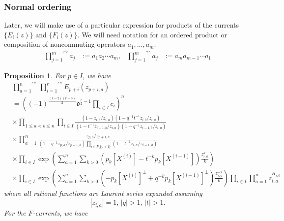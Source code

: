 \documentclass{amsart}
\newcommand{\ddd}{\mathfrak{d}}
\newtheorem{prop}[thm]{Proposition}
\theoremstyle{remark}
\numberwithin{thm}{section}
\numberwithin{equation}{section}
\begin{document}
\subsubsection{Normal ordering}
Later, we will make use of a particular expression for products of the currents $\{E_i(z)\}$ and $\{F_i(z)\}$.
We will need notation for an ordered product or composition of noncommuting operators $a_1,\ldots, a_m$:
\begin{equation}
    \begin{aligned}
    \overset{\curvearrowright}{\prod_{j=1}^m}a_j&:=a_1 a_2\cdots a_m,&
    \overset{\curvearrowleft}{\prod_{j=1}^m}a_j&:=a_m a_{m-1}\cdots a_1
    \end{aligned}
\label{OrdProd}
\end{equation}
\begin{prop}\label{NormalOrder}
For $p\in I$, we have
\begin{equation}
\begin{aligned}
&\overset{\curvearrowright}{\prod_{a=1}^n}\,\overset{\curvearrowright}{\prod_{i=1}^{r}}E_{p+i}(z_{p+i,a})\\
&=
\left( (-1)^{\frac{(r-2)(r-3)}{2}}\ddd^{\frac{r}{2}-1}\prod_{i\in I} c_i\right)^n\\
&\times\prod_{1\le a<b\le n}\prod_{i\in I}
\frac{\displaystyle\left(1-z_{i,b}/z_{i,a}\right)\left(1-q^{-1}t^{-1}z_{i,b}/z_{i,a}\right)}{\displaystyle\left(1-t^{-1}z_{i+1,b}/z_{i,a}\right)\left(1-q^{-1}z_{i-1,b}/z_{i,a}\right)}\\
&\times\prod_{a=1}^n \frac{z_{p,a}/z_{p+1,a}}
{\left(1-q^{-1}z_{p,a}/z_{p+1,a}\right)
\prod_{i\in I\setminus\{p+1\}}
\left(1-t^{-1}z_{i,a}/z_{i-1,a}\right)}\\
&\times\prod_{i\in I}\exp\left(\sum_{a=1}^n\sum_{k>0}\left(p_{k}[X^{(i)}]-t^{-k}p_k[X^{(i-1)}]\right)\frac{z_{i,a}^{k}}{k}\right)\\
&\times\prod_{i\in I}\exp\left(\sum_{a=1}^n\sum_{k>0}\left(-p_{k}[X^{(i)}]^\perp+q^{-k}p_k[X^{(i-1)}]^\perp\right)\frac{z_{i,a}^{-k}}{k}\right)
\prod_{i\in I}\prod_{a=1}^n z_{i,a}^{H_{i,0}}
\end{aligned}
\label{ENormalOrder}
\end{equation}
where all rational functions are Laurent series expanded assuming 
\begin{equation}
|z_{i,a}|=1,\,|q|>1,\,|t|>1.
\label{NormalEExpand}
\end{equation}
For the $F$-currents, we have
\begin{equation}
\begin{aligned}

\end{aligned}
\end{equation}
\end{prop}
\end{document}
